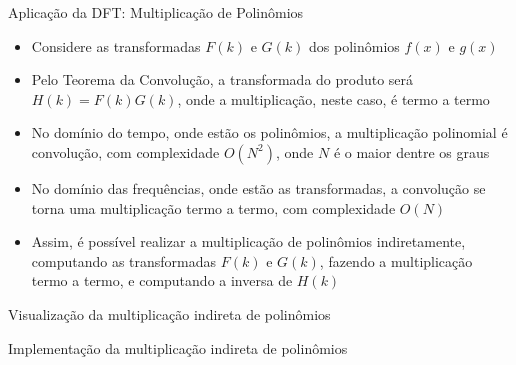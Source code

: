 \begin{frame}[fragile]{Aplicação da DFT: Multiplicação de Polinômios}

    \begin{itemize}
        \item Considere as transformadas $F(k)$ e $G(k)$ dos polinômios $f(x)$ e $g(x)$

        \item Pelo Teorema da Convolução, a transformada do produto será $H(k) = F(k)G(k)$, onde
            a multiplicação, neste caso, é termo a termo

        \item No domínio do tempo, onde estão os polinômios, a multiplicação polinomial é 
            convolução, com complexidade $O(N^2)$, onde $N$ é o maior dentre os graus

        \item No domínio das frequências, onde estão as transformadas, a convolução se torna
            uma multiplicação termo a termo, com complexidade $O(N)$

        \item Assim, é possível realizar a multiplicação de polinômios indiretamente, computando
            as transformadas $F(k)$ e $G(k)$, fazendo a multiplicação termo a termo, e computando
            a inversa de $H(k)$
    \end{itemize}

\end{frame}

\begin{frame}[fragile]{Visualização da multiplicação indireta de polinômios}

    \begin{figure}
        \centering


    \end{figure}

\end{frame}

\begin{frame}[fragile]{Implementação da multiplicação indireta de polinômios}
\end{frame}

